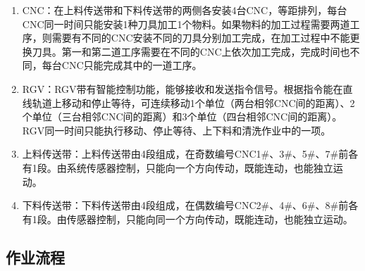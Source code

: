 \documentclass{cumcmthesis}
\begin{document}
\begin{enumerate}[（1）]

\item CNC：在上料传送带和下料传送带的两侧各安装4台CNC，等距排列，每台CNC同一时间只能安装1种刀具加工1个物料。如果物料的加工过程需要两道工序，则需要有不同的CNC安装不同的刀具分别加工完成，在加工过程中不能更换刀具。第一和第二道工序需要在不同的CNC上依次加工完成，完成时间也不同，每台CNC只能完成其中的一道工序。

\item RGV：RGV带有智能控制功能，能够接收和发送指令信号。根据指令能在直线轨道上移动和停止等待，可连续移动1个单位（两台相邻CNC间的距离）、2个单位（三台相邻CNC间的距离）和3个单位（四台相邻CNC间的距离）。RGV同一时间只能执行移动、停止等待、上下料和清洗作业中的一项。

\item 上料传送带：上料传送带由4段组成，在奇数编号CNC1\#、3\#、5\#、7\#前各有1段。由系统传感器控制，只能向一个方向传动，既能连动，也能独立运动。

\item 下料传送带：下料传送带由4段组成，在偶数编号CNC2\#、4\#、6\#、8\#前各有1段。由传感器控制，只能向同一个方向传动，既能连动，也能独立运动。

\end{enumerate}

\subsection{作业流程}
\end{document}
